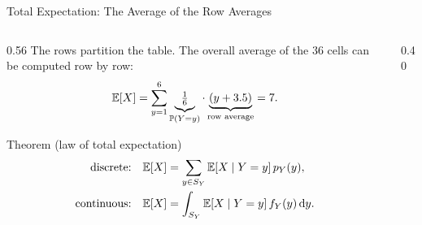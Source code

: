 \begin{frame}{Total Expectation: The Average of the Row Averages}
  \small
  \begin{columns}[T]
    \begin{column}{0.56\textwidth}
      The rows partition the table. The overall average of the $36$ cells can be computed row by row:
      \[
        \mathbb{E}[X]=\sum_{y=1}^6 \underbrace{\tfrac16}_{\mathbb{P}(Y=y)}\cdot\underbrace{(y+3.5)}_{\text{row average}}=7 .
      \]
      \begin{block}{Theorem (law of total expectation)}
        \begin{align*}
          \text{discrete:}&\quad \mathbb{E}[X]=\sum_{y\in S_Y}\mathbb{E}[X\mid Y=y]\,p_Y(y),\\
          \text{continuous:}&\quad \mathbb{E}[X]=\int_{S_Y}\mathbb{E}[X\mid Y=y]\,f_Y(y)\,\mathrm{d} y .
        \end{align*}
      \end{block}
    \end{column}
    \begin{column}{0.40\textwidth}
      \centering
    \end{column}
  \end{columns}
\end{frame}

